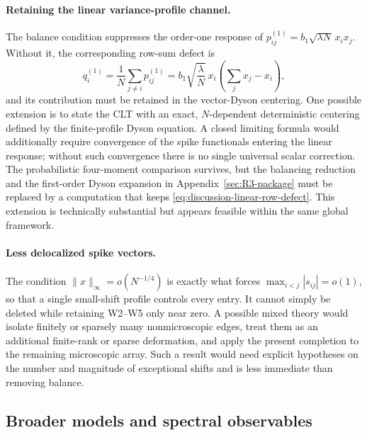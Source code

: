 \documentclass[10pt,a4paper]{amsart}
\newcommand{\norm}[1]{\lVert #1\rVert}
\begin{document}
\paragraph*{Retaining the linear variance-profile channel.}
The balance condition suppresses the order-one response of
\(p_{ij}^{(1)}=b_1\sqrt{\lambda N}\,x_ix_j\).  Without it, the corresponding
row-sum defect is
\begin{equation}\label{eq:discussion-linear-row-defect}
 q_i^{(1)}
 =\frac1N\sum_{j\ne i}p_{ij}^{(1)}
 =b_1\sqrt{\frac{\lambda}{N}}\,x_i
   \left(\sum_jx_j-x_i\right),
\end{equation}
and its contribution must be retained in the vector-Dyson centering.  One
possible extension is to state the CLT with an exact, $N$-dependent
deterministic centering defined by the finite-profile Dyson equation.  A
closed limiting formula would additionally require convergence of the spike
functionals entering the linear response; without such convergence there is
no single universal scalar correction.  The probabilistic four-moment
comparison survives, but the balancing reduction and the first-order Dyson
expansion in Appendix~\ref{sec:R3-package} must be replaced by a computation
that keeps \eqref{eq:discussion-linear-row-defect}.  This extension is
technically substantial but appears feasible within the same global
framework.

\paragraph*{Less delocalized spike vectors.}
The condition \(\norm{x}_\infty=o(N^{-1/4})\) is exactly what forces
\(\max_{i<j}|s_{ij}|=o(1)\), so that a single small-shift profile controls every
entry.  It cannot simply be deleted while retaining W2--W5 only near zero.
A possible mixed theory would isolate finitely or sparsely many
nonmicroscopic edges, treat them as an additional finite-rank or sparse
deformation, and apply the present completion to the remaining microscopic
array.  Such a result would need explicit hypotheses on the number and
magnitude of exceptional shifts and is less immediate than removing balance.

\subsection{Broader models and spectral observables}
\label{subsec:discussion-models}
\end{document}
